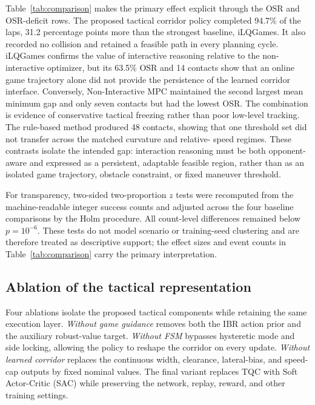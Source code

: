 Table~\ref{tab:comparison} makes the primary effect explicit through the OSR
and OSR-deficit rows. The proposed tactical corridor policy completed 94.7\%
of the laps, 31.2 percentage points more than the strongest baseline,
iLQGames. It also recorded no collision and retained a feasible path in every
planning cycle.
iLQGames confirms the value of interactive reasoning relative to the
non-interactive optimizer, but its 63.5\% OSR and 14 contacts show that an
online game trajectory alone did not provide the persistence of the learned
corridor interface. Conversely, Non-Interactive MPC maintained the second
largest mean minimum gap and only seven contacts but had the lowest OSR. The
combination is evidence of conservative tactical freezing rather than poor
low-level tracking. The rule-based method produced 48 contacts, showing that
one threshold set did not transfer across the matched curvature and relative-
speed regimes. These contrasts isolate the intended gap: interaction reasoning
must be both opponent-aware and expressed as a persistent, adaptable feasible
region, rather than as an isolated game trajectory, obstacle constraint, or
fixed maneuver threshold.

For transparency, two-sided two-proportion $z$ tests were recomputed from the
machine-readable integer success counts and adjusted across the four baseline comparisons by
the Holm procedure. All count-level differences remained below
$p=10^{-6}$. These tests do not model scenario or training-seed clustering and
are therefore treated as descriptive support; the effect sizes and event
counts in Table~\ref{tab:comparison} carry the primary interpretation.

\subsection{Ablation of the tactical representation}
\label{subsec:ablation}

Four ablations isolate the proposed tactical components while retaining the
same execution layer. \emph{Without game guidance} removes both the IBR action
prior and the auxiliary robust-value target. \emph{Without FSM} bypasses
hysteretic mode and side locking, allowing the policy to reshape the corridor
on every update. \emph{Without learned corridor} replaces the continuous
width, clearance, lateral-bias, and speed-cap outputs by fixed nominal values.
The final variant replaces TQC with Soft Actor-Critic (SAC) while preserving
the network, replay, reward, and other training settings.

